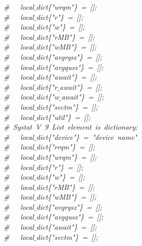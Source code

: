 \mbox{}\ \ \ \textit{\#\ \ \ local$\_$dict\{"{}wrqm"{}\}\ =\ [];} \\
\mbox{}\ \ \ \textit{\#\ \ \ local$\_$dict\{"{}r"{}\}\ =\ [];} \\
\mbox{}\ \ \ \textit{\#\ \ \ local$\_$dict\{"{}w"{}\}\ =\ [];} \\
\mbox{}\ \ \ \textit{\#\ \ \ local$\_$dict\{"{}rMB"{}\}\ =\ [];} \\
\mbox{}\ \ \ \textit{\#\ \ \ local$\_$dict\{"{}wMB"{}\}\ =\ [];} \\
\mbox{}\ \ \ \textit{\#\ \ \ local$\_$dict\{"{}avgrqsz"{}\}\ =\ [];} \\
\mbox{}\ \ \ \textit{\#\ \ \ local$\_$dict\{"{}avgqusz"{}\}\ =\ [];} \\
\mbox{}\ \ \ \textit{\#\ \ \ local$\_$dict\{"{}await"{}\}\ =\ [];} \\
\mbox{}\ \ \ \textit{\#\ \ \ local$\_$dict\{"{}r$\_$await"{}\}\ =\ [];} \\
\mbox{}\ \ \ \textit{\#\ \ \ local$\_$dict\{"{}w$\_$await"{}\}\ =\ [];} \\
\mbox{}\ \ \ \textit{\#\ \ \ local$\_$dict\{"{}svctm"{}\}\ =\ [];} \\
\mbox{}\ \ \ \textit{\#\ \ \ local$\_$dict\{"{}util"{}\}\ =\ [];} \\
\mbox{}\ \ \ \textit{\#\ Systat\ V\ 9\ List\ element\ is\ dictionary:} \\
\mbox{}\ \ \ \textit{\#\ \ \ local$\_$dict\{"{}device"{}\}\ =\ "{}device\ name"{}} \\
\mbox{}\ \ \ \textit{\#\ \ \ local$\_$dict\{"{}rrqm"{}\}\ =\ [];} \\
\mbox{}\ \ \ \textit{\#\ \ \ local$\_$dict\{"{}wrqm"{}\}\ =\ [];} \\
\mbox{}\ \ \ \textit{\#\ \ \ local$\_$dict\{"{}r"{}\}\ =\ [];} \\
\mbox{}\ \ \ \textit{\#\ \ \ local$\_$dict\{"{}w"{}\}\ =\ [];} \\
\mbox{}\ \ \ \textit{\#\ \ \ local$\_$dict\{"{}rMB"{}\}\ =\ [];} \\
\mbox{}\ \ \ \textit{\#\ \ \ local$\_$dict\{"{}wMB"{}\}\ =\ [];} \\
\mbox{}\ \ \ \textit{\#\ \ \ local$\_$dict\{"{}avgrqsz"{}\}\ =\ [];} \\
\mbox{}\ \ \ \textit{\#\ \ \ local$\_$dict\{"{}avgqusz"{}\}\ =\ [];} \\
\mbox{}\ \ \ \textit{\#\ \ \ local$\_$dict\{"{}await"{}\}\ =\ [];} \\
\mbox{}\ \ \ \textit{\#\ \ \ local$\_$dict\{"{}svctm"{}\}\ =\ [];} \\
